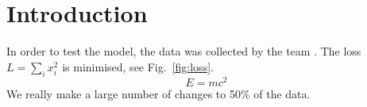 \documentclass{article}
\begin{document}
\section{Introduction}
In order to test the model, the data was collected by the team \cite{doe2024}.
The loss $L = \sum_i x_i^2$ is minimised, see Fig.~\ref{fig:loss}.
\begin{equation}
E = mc^2
\end{equation}
We really make a large number of changes to 50\% of the data.
\end{document}
